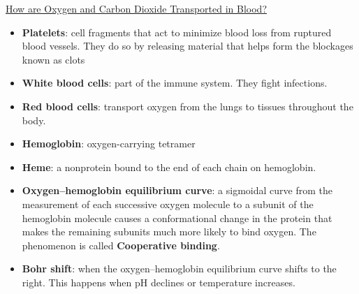 \documentclass[12pt,letterpaper]{article}
\begin{document}
\hypertarget{42.4}{}
\begin{secbox}{\hyperlink{42}{How are Oxygen and Carbon Dioxide Transported in Blood?}}{
    \begin{itemize}
        \item \textbf{Platelets}: cell fragments that act to minimize blood loss from ruptured blood vessels. They do so by releasing material that helps form the blockages known as clots 
        \item \textbf{White blood cells}: part of the immune system. They fight infections.
        \item \textbf{Red blood cells}: transport oxygen from the lungs to tissues throughout the body. 
        \item \textbf{Hemoglobin}: oxygen-carrying tetramer
        \item \textbf{Heme}: a nonprotein bound to the end of each chain on hemoglobin.
        \item \textbf{Oxygen–hemoglobin equilibrium curve}: a sigmoidal curve from the measurement of each successive oxygen molecule to a subunit of the hemoglobin molecule causes a conformational change in the protein that makes the remaining subunits much more likely to bind oxygen. The phenomenon is called \textbf{Cooperative binding}.
        \item \textbf{Bohr shift}: when the oxygen–hemoglobin equilibrium curve shifts to the right. This happens when pH declines or temperature increases.
    \end{itemize}
}\end{secbox}
\end{document}
